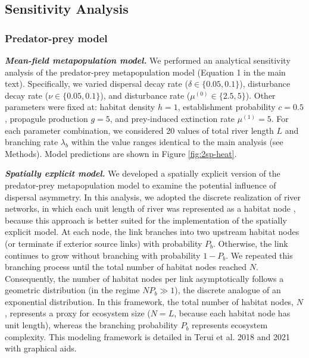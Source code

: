 \documentclass[11pt, class=article, crop=false]{standalone}
\theoremstyle{definition}
\begin{document}
\newpage

\subsection{Sensitivity Analysis}

\subsubsection{Predator-prey model}

\textit{\textbf{Mean-field metapopulation model.}}
We performed an analytical sensitivity analysis of the predator-prey metapopulation model (Equation 1 in the main text). 
Specifically, we varied dispersal decay rate ($\delta \in \{0.05, 0.1\}$), disturbance decay rate ($\nu \in \{0.05, 0.1\}$), and disturbance rate ($\mu^{(0)} \in \{2.5, 5\}$). 
Other parameters were fixed at: habitat density $h = 1$, establishment probability $c = 0.5$, propagule production $g = 5$, and prey-induced extinction rate $\mu^{(1)} = 5$.
For each parameter combination, we considered 20 values of total river length $L$ and branching rate $\lambda_b$ within the value ranges identical to the main analysis (see Methods).
Model predictions are shown in Figure \ref{fig:2sp-heat}.

\textit{\textbf{Spatially explicit model.}}
We developed a spatially explicit version of the predator-prey metapopulation model to examine the potential influence of dispersal asymmetry. 
In this analysis, we adopted the discrete realization of river networks, in which each unit length of river was represented as a habitat node \citep{yeakel_synchronisation_2014, terui_metapopulation_2018, anderson_effects_2018, terui_emergent_2021}, because this approach is better suited for the implementation of the spatially explicit model.
At each node, the link branches into two upstream habitat nodes (or terminate if exterior source links) with probability $P_b$. 
Otherwise, the link continues to grow without branching with probability $1 - P_b$.
We repeated this branching process until the total number of habitat nodes reached $N$.
Consequently, the number of habitat nodes per link asymptotically follows a geometric distribution (in the regime $NP_b \gg 1$), the discrete analogue of an exponential distribution. 
In this framework, the total number of habitat nodes, $N$, represents a proxy for ecosystem size ($N=L$, because each habitat node has unit length), whereas the branching probability $P_b$ represents ecosystem complexity. 
This modeling framework is detailed in Terui et al. 2018 \citep{terui_metapopulation_2018} and 2021 \citep{terui_emergent_2021} with graphical aids.
\end{document}
